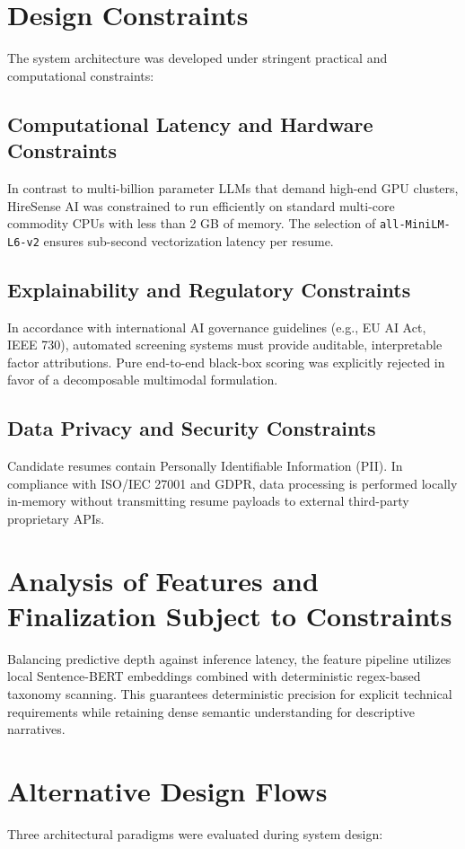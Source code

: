 \documentclass[12pt,a4paper]{report}
\begin{document}
\section{Design Constraints}
The system architecture was developed under stringent practical and computational constraints:
\subsection{Computational Latency and Hardware Constraints}
In contrast to multi-billion parameter LLMs that demand high-end GPU clusters, HireSense AI was constrained to run efficiently on standard multi-core commodity CPUs with less than 2 GB of memory. The selection of \texttt{all-MiniLM-L6-v2} ensures sub-second vectorization latency per resume.

\subsection{Explainability and Regulatory Constraints}
In accordance with international AI governance guidelines (e.g., EU AI Act, IEEE 730), automated screening systems must provide auditable, interpretable factor attributions. Pure end-to-end black-box scoring was explicitly rejected in favor of a decomposable multimodal formulation.

\subsection{Data Privacy and Security Constraints}
Candidate resumes contain Personally Identifiable Information (PII). In compliance with ISO/IEC 27001 and GDPR, data processing is performed locally in-memory without transmitting resume payloads to external third-party proprietary APIs.

\section{Analysis of Features and Finalization Subject to Constraints}
Balancing predictive depth against inference latency, the feature pipeline utilizes local Sentence-BERT embeddings combined with deterministic regex-based taxonomy scanning. This guarantees deterministic precision for explicit technical requirements while retaining dense semantic understanding for descriptive narratives.

\section{Alternative Design Flows}
Three architectural paradigms were evaluated during system design:
\end{document}
